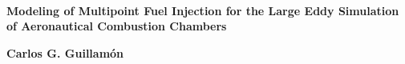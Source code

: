\setlength{\unitlength}{1 cm} %
\thispagestyle{empty}




~ ~

\vspace{5.5cm}
  
\begin{center}

\Huge \textbf{Modeling of Multipoint Fuel Injection for the Large Eddy Simulation of Aeronautical Combustion Chambers}



\vspace{10.5cm}

{\LARGE \textbf{Carlos G. Guillam\'on}}\\[1cm]
\end{center}


